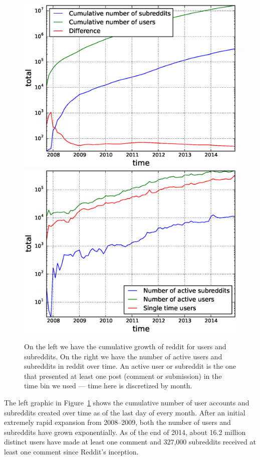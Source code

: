 \begin{figure}[tb]
\centering
\includegraphics[scale=0.4]{./images/cumulative_users_subreddits.eps}
\includegraphics[scale=0.4]{./images/active_users_subreddits.eps}
\caption{On the left we have the cumulative growth of reddit for users and subreddits. On the right we have the number of active users and subreddits in reddit over time. An active user or subreddit is the one that presented at least one post (comment or submission) in the time bin we used --- time here is discretized by month.}
\label{fig:cumulative}
\end{figure}


The left graphic in Figure~\ref{fig:cumulative} shows the cumulative number of user accounts and subreddits created over time as of the last day of every month. 
After an initial extremely rapid expansion from 2008--2009, both the number of users and subreddits have grown exponentially.  As of the end of 2014, about 16.2 million distinct users have made at least one comment and 327,000 subreddits received at least one comment since Reddit's inception.

